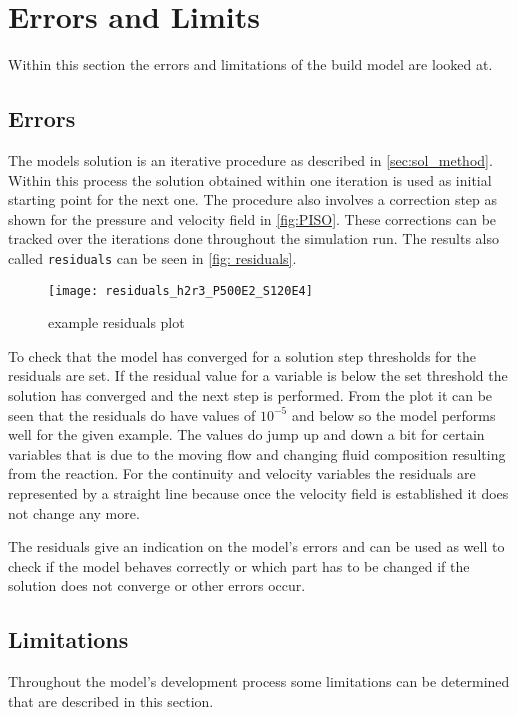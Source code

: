 \documentclass[../thesis.tex]{subfiles}
\begin{document}
\chapter{Errors and Limits}
\label{chp:err_lims}

Within this section the errors and limitations of the build model are looked at.

\section{Errors}

The models solution is an iterative procedure as described in \autoref{sec:sol_method}. Within this process the solution obtained within one iteration is used as initial starting point for the next one. The procedure also involves a correction step as shown for the pressure and velocity field in \autoref{fig:PISO}. These corrections can be tracked over the iterations done throughout the simulation run. The results also called \texttt{residuals} can be seen in \autoref{fig: residuals}.
\begin{figure}[htbp]
	\centering
	\texttt{[image: residuals\_h2r3\_P500E2\_S120E4]}
	\caption{example residuals plot}
	\label{fig: residuals}
\end{figure}
To check that the model has converged for a solution step thresholds for the residuals are set. If the residual value for a variable is below the set threshold the solution has converged and the next step is performed. From the plot it can be seen that the residuals do have values of $10^{-5}$ and below so the model performs well for the given example. The values do jump up and down a bit for certain variables that is due to the moving flow and changing fluid composition resulting from the reaction. For the continuity and velocity variables the residuals are represented by a straight line because once the velocity field is established it does not change any more.

The residuals give an indication on the model's errors and can be used as well to check if the model behaves correctly or which part has to be changed if the solution does not converge or other errors occur.

\section{Limitations}
\label{sec: lim_improv}
Throughout the model's development process some limitations can be determined that are described in this section.
\end{document}
